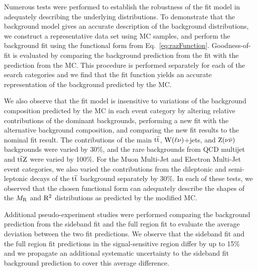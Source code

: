 Numerous tests were performed to establish the robustness of the fit
model in adequately describing the underlying distributions. To
demonstrate that the background model gives an accurate description of the 
background distributions, we construct a representative
data set using MC samples, and perform the background fit using
the functional form from Eq.~\ref{eq:razFunction}. Goodness-of-fit is
evaluated by comparing the background prediction from the fit with the
prediction from the MC. This procedure is performed
separately for each of the search categories and we find
that the fit function yields an accurate representation of the
background predicted by the MC.

We also observe that the fit model is insensitive to variations of the background
composition predicted by the MC in each event category by altering
relative contributions of the dominant backgrounds, performing a
new fit with the alternative background composition, and comparing
the new fit results to the nominal fit result. The contributions
of the main $\mathrm{t}\overline{\mathrm{t}}$, $\mathrm{W}(\ell\nu)$+jets, and $\mathrm{Z}(\nu\bar\nu)$ backgrounds 
were varied by 30\%, and the rare backgrounds from QCD multijet and $\mathrm{t}\overline{\mathrm{t}}\mathrm{Z}$ 
were varied by 100\%. For the Muon Multi-Jet and Electron Multi-Jet event categories,
we also varied the contributions from the dileptonic and semi-leptonic decays
of the $\mathrm{t}\overline{\mathrm{t}}$ background separately by 30\%. In each of these tests, we 
observed that the chosen functional form can adequately describe the shapes of 
the $M_\mathrm{R}$ and $\mathrm{R}^2$ distributions as predicted by the modified MC.

Additional pseudo-experiment studies were performed comparing the background prediction
from the sideband fit and the full region fit to evaluate the average
deviation between the two fit predictions. We observe that 
the sideband fit and the full region fit predictions in the
signal-sensitive region differ by up to 15\% and we propagate an
additional systematic uncertainty to the sideband fit background
prediction to cover this average difference.

